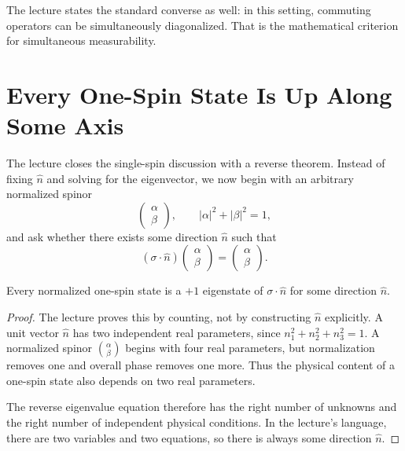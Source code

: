 The lecture states the standard converse as well: in this setting, commuting operators can be simultaneously diagonalized. That is the mathematical criterion for simultaneous measurability.

\section{Every One-Spin State Is Up Along Some Axis}

The lecture closes the single-spin discussion with a reverse theorem. Instead of fixing \(\hat n\) and solving for the eigenvector, we now begin with an arbitrary normalized spinor
\begin{equation}
\begin{pmatrix}
\alpha\\
\beta
\end{pmatrix},
\qquad
|\alpha|^2+|\beta|^2=1,
\end{equation}
and ask whether there exists some direction \(\hat n\) such that
\begin{equation}
(\sigma\cdot\hat n)
\begin{pmatrix}
\alpha\\
\beta
\end{pmatrix}
=
\begin{pmatrix}
\alpha\\
\beta
\end{pmatrix}.
\end{equation}

\begin{theorem}
Every normalized one-spin state is a \(+1\) eigenstate of \(\sigma\cdot\hat n\) for some direction \(\hat n\).
\end{theorem}

\begin{proof}
The lecture proves this by counting, not by constructing \(\hat n\) explicitly. A unit vector \(\hat n\) has two independent real parameters, since \(n_1^2+n_2^2+n_3^2=1\). A normalized spinor \(\binom{\alpha}{\beta}\) begins with four real parameters, but normalization removes one and overall phase removes one more. Thus the physical content of a one-spin state also depends on two real parameters.

The reverse eigenvalue equation therefore has the right number of unknowns and the right number of independent physical conditions. In the lecture's language, there are two variables and two equations, so there is always some direction \(\hat n\).
\end{proof}

